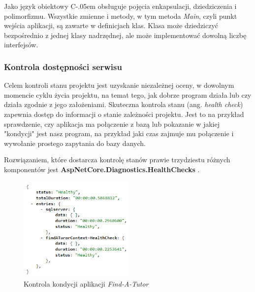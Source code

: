 \documentclass[12pt]{article}
\newcommand{\Csharp}{%
  {\settoheight{\dimen0}{C}C\kern-.05em \resizebox{!}{\dimen0}{\raisebox{\depth}{\# }}}}
\numberwithin{figure}{section}
\begin{document}
\begin{sloppypar}
Jako język obiektowy \Csharp obsługuje pojęcia enkapsulacji, dziedziczenia i polimorfizmu. Wszystkie zmienne i metody, w tym metoda \textit{Main}, czyli punkt wejścia aplikacji, są zawarte w definicjach klas. Klasa może dziedziczyć bezpośrednio z jednej klasy nadrzędnej, ale może implementować dowolną liczbę interfejsów.


\subsubsection{Kontrola dostępności serwisu}
Celem kontroli stanu projektu jest uzyskanie niezależnej oceny, w dowolnym momencie cyklu życia projektu, na temat tego, jak dobrze program działa lub czy działa zgodnie z jego założeniami. Skuteczna kontrola stanu (ang. \textit{health check}) zapewnia dostęp do informacji o stanie zależności projektu. Jest to na przykład sprawdzenie, czy aplikacja ma połączenie z bazą lub pokazanie w jakiej "kondycji" jest nasz program, na przykład jaki czas zajmuje mu połączenie i wywołanie prostego zapytania do bazy danych.
    
Rozwiązaniem, które dostarcza kontrolę stanów prawie trzydziestu różnych komponentów jest \textbf{AspNetCore.Diagnostics.HealthChecks} \cite{health-checks-github}.
        
\begin{figure}[H] 
    \centering
    \includegraphics[width=0.5\textwidth]{images/chapter_3/api-health-check.png}
    \caption{Kontrola kondycji aplikacji \textit{Find-A-Tutor}}
    \label{fig:health-check}
\end{figure}
    

\end{sloppypar}
\end{document}
